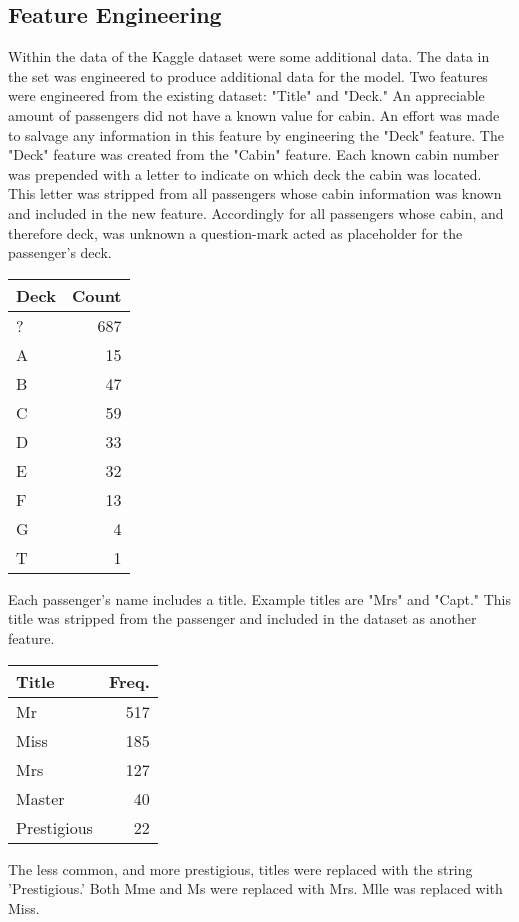 \documentclass[10pt]{article}
\begin{document}
\begin{multicols}{2}
\subsection{Feature Engineering}
	Within the data of the Kaggle dataset were some additional data.
	The data in the set was engineered to produce additional data for the model.
	Two features were engineered from the existing dataset: "Title" and "Deck."
	An appreciable amount of passengers did not have a known value for cabin.
	An effort was made to salvage any information in this feature by engineering the "Deck" feature.
	The "Deck" feature was created from the "Cabin" feature.
	Each known cabin number was prepended with a letter to indicate on which deck the cabin was located.
	This letter was stripped from all passengers whose cabin information was known and included in the new feature.
	Accordingly for all passengers whose cabin, and therefore deck, was unknown a question-mark acted as placeholder for the passenger's deck.
	\begin{center}
	\begin{tabular}{l r}
		Deck	& Count\\
		\hline
		? 	& 687\\
		A 	& 15\\
		B 	& 47\\
		C 	& 59\\
		D 	& 33\\
		E 	& 32\\
		F 	& 13\\
		G 	& 4\\
		T 	& 1\\
	\end{tabular}
	\end{center}
	Each passenger's name includes a title.
	Example titles are "Mrs" and "Capt."
	This title was stripped from the passenger and included in the dataset as another feature.\\
	\begin{center}
	\begin{tabular}{l r}
		Title         &	Freq.\\
		\hline
		Mr            & 517\\
		Miss          & 185\\
		Mrs           & 127\\
		Master         & 40\\
		Prestigious    & 22\\
	\end{tabular}
	\end{center}
	The less common, and more prestigious, titles were replaced with the string 'Prestigious.'
	Both Mme and Ms were replaced with Mrs.
	Mlle was replaced with Miss.


\end{multicols}
\end{document}
